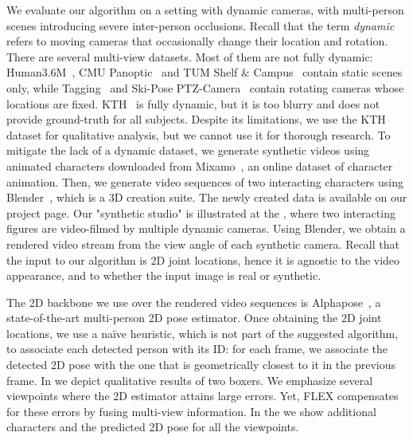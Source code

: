 We evaluate our algorithm on
a setting with dynamic cameras, with multi-person scenes introducing
severe inter-person occlusions.
Recall that the term \emph{dynamic} refers to moving cameras that occasionally change their location and rotation.
There are several multi-view datasets. Most of them are not fully dynamic: Human3.6M~\cite{h36m_pami,IonescuSminchisescu11}, CMU Panoptic~\cite{CMU:mocap} and TUM Shelf $\&$ Campus~\cite{campus_shelf} contain static scenes only, while Tagging~\cite{tagging_dataset} and Ski-Pose PTZ-Camera~\cite{ski_ptz} contain  rotating cameras whose locations are fixed. KTH~\cite{footballDS} is fully dynamic, but it is too blurry and does not provide ground-truth for all subjects.
Despite its limitations, we use the KTH dataset for qualitative analysis, but we cannot use it for thorough research.
To mitigate the lack of a dynamic dataset, we generate synthetic videos using animated characters downloaded from Mixamo~\cite{mixamo}, an online dataset of character animation. Then, we generate video sequences of two interacting characters using Blender~\cite{blender}, which is a 3D creation suite. The newly created data is available on our project page.
Our "synthetic studio" is illustrated at the \fi, where two interacting figures are video-filmed by multiple dynamic cameras.
Using Blender, we obtain a rendered video stream from the view angle of each synthetic camera. 
Recall that the input to our algorithm is 2D joint locations, hence it is agnostic to the video appearance, and to whether the input image is real or synthetic.

The 2D backbone we use over the rendered video sequences is Alphapose~\cite{alphapose}, a state-of-the-art multi-person 2D pose estimator.
Once obtaining the 2D joint locations, we use a na\"ive heuristic, which is not part of the suggested algorithm, to associate each detected person with its ID: for each frame, we associate the detected 2D pose with the one that is geometrically closest to it in the previous frame. 
In  we depict qualitative results of two boxers. We emphasize several viewpoints where the 2D estimator attains large errors. Yet, FLEX compensates for these errors by fusing multi-view information. In the \fi we show additional characters and the predicted 2D pose for all the viewpoints.


